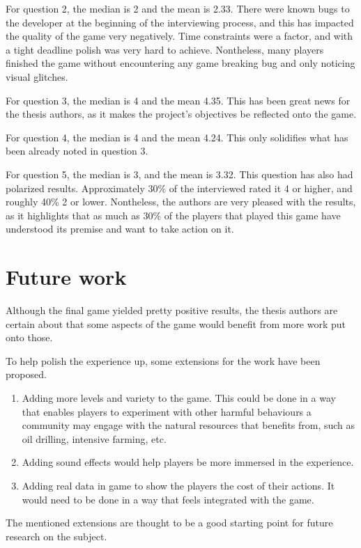 For question 2, the median is 2 and the mean is 2.33. There were known
bugs to the developer at the beginning of the interviewing process,
and this has impacted the quality of the game very negatively. Time
constraints were a factor, and with a tight deadline polish was very
hard to achieve. Nontheless, many players finished the game without
encountering any game breaking bug and only noticing visual glitches.

For question 3, the median is 4 and the mean 4.35. This has been great
news for the thesis authors, as it makes the project's objectives
be reflected onto the game.

For question 4, the median is 4 and the mean 4.24. This only solidifies
what has been already noted in question 3.

For question 5, the median is 3, and the mean is 3.32. This question
has also had polarized results. Approximately 30\% of the interviewed
rated it 4 or higher, and roughly 40\% 2 or lower. Nontheless, the authors
are very pleased with the results, as it highlights that as much as
30\% of the players that played this game have understood its premise
and want to take action on it.

\section{Future work}

Although the final game yielded pretty positive results,
the thesis authors are certain about that some aspects of the game would
benefit from more work put onto those.

To help polish the experience up, some extensions for the work have been
proposed.

\begin{enumerate}
\item Adding more levels and variety to the game. This could be done in a
way that enables players to experiment with other harmful behaviours a 
community may engage with the natural resources that benefits from, such
as oil drilling, intensive farming, etc.
\item Adding sound effects would help players be more immersed in the
experience.
\item Adding real data in game to show the players the cost of their actions.
It would need to be done in a way that feels integrated with the game.
\end{enumerate}

The mentioned extensions are thought to be a good starting point for future
research on the subject.
